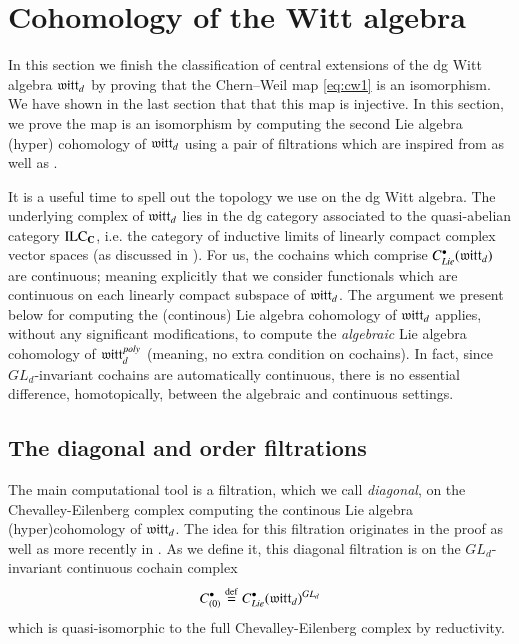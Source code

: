 \documentclass[main.tex]{subfiles}
\begin{document}
\section{Cohomology of the Witt algebra}\label{s:gf}

In this section we finish the classification of central extensions of the dg Witt algebra $\mathfrak{witt}_d$ by proving that
the Chern--Weil map \eqref{eq:cw1} is an isomorphism.
We have shown in the last section that that this map is injective.
In this section, we prove the map is an isomorphism by computing the second Lie algebra (hyper) cohomology of $\mathfrak{witt}
_d$ using a pair of filtrations which are inspired from \cite[section 2.4.1]{FuksBook} as well as \cite{HKgf}.

It is a useful time to spell out the topology we use on the dg Witt algebra. 
The underlying complex of $\mathfrak{witt}_d$ lies in the dg category associated to the quasi-abelian category $\mathrm{ILC}_{\mathbf{C}}$, i.e. the category of inductive limits of linearly compact complex vector spaces (as discussed in \cite[section 4.1]{FHK}).
For us, the cochains which comprise $C^\bullet_{Lie}(\mathfrak{witt}_d)$ are continuous; meaning explicitly that we consider functionals which are continuous on each linearly compact subspace of $\mathfrak{witt}_d$.
The argument we present below for computing the (continous) Lie algebra cohomology of $\mathfrak{witt}_d$ applies, without any significant modifications, to compute the \textit{algebraic} Lie algebra cohomology of $\mathfrak{witt}_d^{poly}$ (meaning, no extra condition on cochains).
In fact, since $GL_d$-invariant cochains are automatically continuous, there is no essential difference, homotopically, between the algebraic and continuous settings.

\subsection{The diagonal and order filtrations}

The main computational tool is a filtration, which we call \textit{diagonal}, on the Chevalley-Eilenberg complex
computing the continous Lie algebra (hyper)cohomology of
$\mathfrak{witt}_d$.
The idea for this filtration originates in the proof \cite[theorem 2.4.1a,b]{FuksBook} as well as more recently in
\cite{HKgf}.
As we define it, this diagonal filtration is on the $GL_d$-invariant continuous cochain complex
\begin{equation}\label{}
  C_{(0)}^{\bullet} \overset{\rm def}{=} C^\bullet_{Lie}(\mathfrak{witt}_d)^{GL_d}
\end{equation}
which is quasi-isomorphic to the full Chevalley-Eilenberg complex by reductivity.
\end{document}
